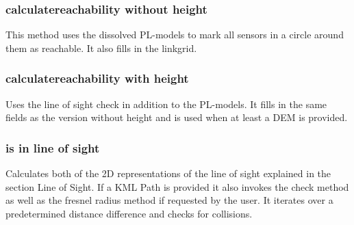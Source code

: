 \documentclass[12pt,a4paper]{article}
\begin{document}
\subsubsection{calculatereachability without height}
This method uses the dissolved PL-models to mark all sensors in a circle around them as reachable. It also fills in the linkgrid.
\subsubsection{calculatereachability with height}
Uses the line of sight check in addition to the PL-models. It fills in the same fields as the version without height and is used when at least a DEM is provided.
\subsubsection{is in line of sight}
Calculates both of the 2D representations of the line of sight explained in the section Line of Sight. If a KML Path is provided it also invokes the check method as well as the fresnel radius method if requested by the user. It iterates over a predetermined distance difference and checks for collisions.
\pagebreak

\listoftables



\end{document}
